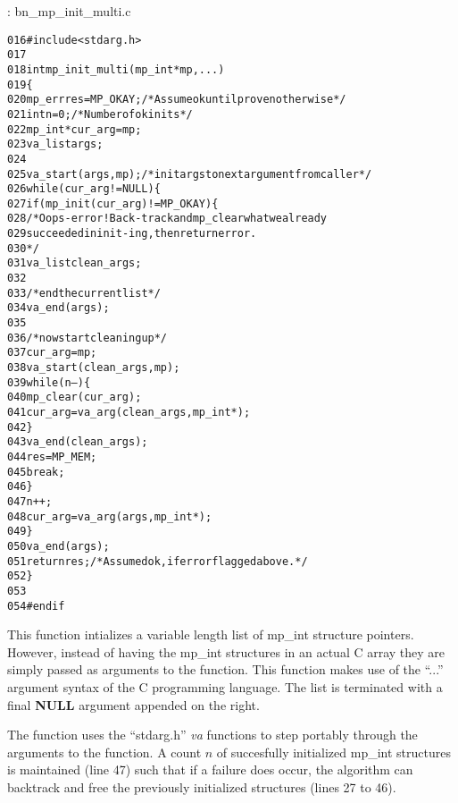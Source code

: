 \documentclass[b5paper]{book}
\begin{document}
\vspace{+3mm}\begin{small}
\hspace{-5.1mm}{\bf File}: bn\_mp\_init\_multi.c
\vspace{-3mm}
\begin{alltt}
016   #include <stdarg.h>
017   
018   int mp_init_multi(mp_int *mp, ...) 
019   \{
020       mp_err res = MP_OKAY;      /* Assume ok until proven otherwise */
021       int n = 0;                 /* Number of ok inits */
022       mp_int* cur_arg = mp;
023       va_list args;
024   
025       va_start(args, mp);        /* init args to next argument from caller */
026       while (cur_arg != NULL) \{
027           if (mp_init(cur_arg) != MP_OKAY) \{
028               /* Oops - error! Back-track and mp_clear what we already
029                  succeeded in init-ing, then return error.
030               */
031               va_list clean_args;
032               
033               /* end the current list */
034               va_end(args);
035               
036               /* now start cleaning up */            
037               cur_arg = mp;
038               va_start(clean_args, mp);
039               while (n--) \{
040                   mp_clear(cur_arg);
041                   cur_arg = va_arg(clean_args, mp_int*);
042               \}
043               va_end(clean_args);
044               res = MP_MEM;
045               break;
046           \}
047           n++;
048           cur_arg = va_arg(args, mp_int*);
049       \}
050       va_end(args);
051       return res;                /* Assumed ok, if error flagged above. */
052   \}
053   
054   #endif
\end{alltt}
\end{small}

This function intializes a variable length list of mp\_int structure pointers.  However, instead of having the mp\_int
structures in an actual C array they are simply passed as arguments to the function.  This function makes use of the 
``...'' argument syntax of the C programming language.  The list is terminated with a final \textbf{NULL} argument 
appended on the right.  

The function uses the ``stdarg.h'' \textit{va} functions to step portably through the arguments to the function.  A count
$n$ of succesfully initialized mp\_int structures is maintained (line 47) such that if a failure does occur,
the algorithm can backtrack and free the previously initialized structures (lines 27 to 46).  
\end{document}

